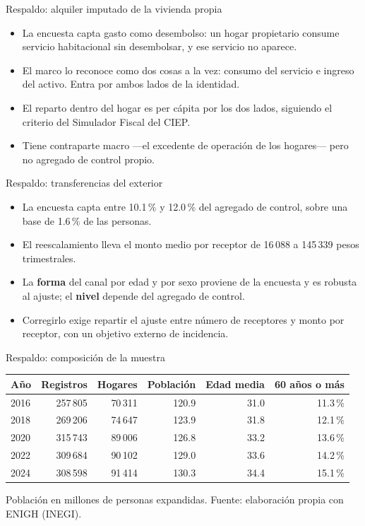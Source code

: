 \documentclass[aspectratio=169,11pt]{beamer}
\begin{document}
\begin{frame}{Respaldo: alquiler imputado de la vivienda propia}
\begin{itemize}\small\itemsep0.45em
  \item La encuesta capta gasto como desembolso: un hogar propietario consume servicio
        habitacional sin desembolsar, y ese servicio no aparece.
  \item El marco lo reconoce como dos cosas a la vez: consumo del servicio e ingreso del activo.
        Entra por ambos lados de la identidad.
  \item El reparto dentro del hogar es per cápita por los dos lados, siguiendo el criterio del
        Simulador Fiscal del CIEP.
  \item Tiene contraparte macro ---el excedente de operación de los hogares--- pero no agregado de
        control propio.
\end{itemize}
\end{frame}

\begin{frame}{Respaldo: transferencias del exterior}
\begin{itemize}\small\itemsep0.45em
  \item La encuesta capta entre 10.1\,\% y 12.0\,\% del agregado de control, sobre una base de
        1.6\,\% de las personas.
  \item El reescalamiento lleva el monto medio por receptor de 16\,088 a 145\,339 pesos
        trimestrales.
  \item La \textbf{forma} del canal por edad y por sexo proviene de la encuesta y es robusta al
        ajuste; el \textbf{nivel} depende del agregado de control.
  \item Corregirlo exige repartir el ajuste entre número de receptores y monto por receptor, con
        un objetivo externo de incidencia.
\end{itemize}
\end{frame}

\begin{frame}{Respaldo: composición de la muestra}
\begin{center}\small
\begin{tabular}{lrrrrr}
\toprule
Año & Registros & Hogares & Población & Edad media & 60 años o más \\
\midrule
2016 & 257\,805 & 70\,311 & 120.9 & 31.0 & 11.3\,\% \\
2018 & 269\,206 & 74\,647 & 123.9 & 31.8 & 12.1\,\% \\
2020 & 315\,743 & 89\,006 & 126.8 & 33.2 & 13.6\,\% \\
2022 & 309\,684 & 90\,102 & 129.0 & 33.6 & 14.2\,\% \\
2024 & 308\,598 & 91\,414 & 130.3 & 34.4 & 15.1\,\% \\
\bottomrule
\end{tabular}
\end{center}
\vspace{0.5em}
{\footnotesize Población en millones de personas expandidas. Fuente: elaboración propia con ENIGH
(INEGI).}
\end{frame}
\end{document}
